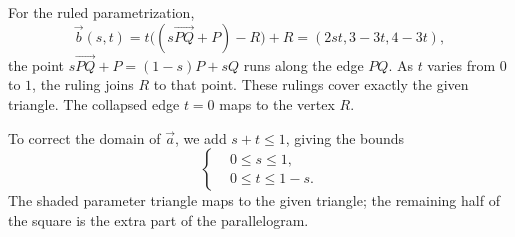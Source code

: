 \documentclass[12pt]{exam}
\begin{document}
\begin{enumerate}
For the ruled parametrization,
\[
\vec b(s,t)=t\bigl((s\vec{PQ}+P)-R\bigr)+R
=(2st,3-3t,4-3t),
\]
the point $s\vec{PQ}+P=(1-s)P+sQ$ runs along the edge $PQ$.
As $t$ varies from $0$ to $1$, the ruling joins $R$ to that point.
These rulings cover exactly the given triangle. The collapsed edge
$t=0$ maps to the vertex $R$.

\medskip
\noindent\begin{minipage}[c]{0.63\linewidth}
To correct the domain of $\vec a$, we add $s+t\le1$, giving the bounds
\[
\left\{
\begin{aligned}
&0\le s\le1,\\
&0\le t\le1-s.
\end{aligned}
\right.
\]
The shaded parameter triangle maps to the given triangle; the remaining half of
the square is the extra part of the parallelogram.
\end{minipage}\hfill
\begin{minipage}[c]{0.33\linewidth}
\centering
{}
\end{minipage}

\end{enumerate}
\end{document}
